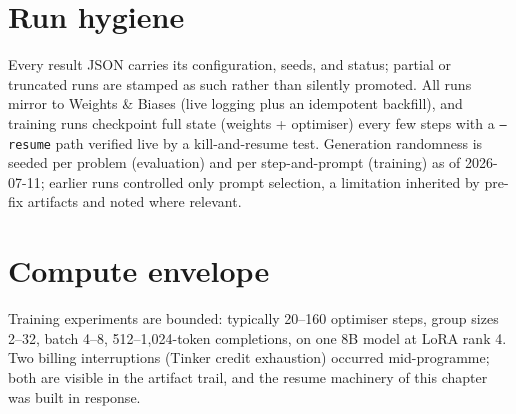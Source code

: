 \section{Run hygiene}
Every result JSON carries its configuration, seeds, and status; partial or
truncated runs are stamped as such rather than silently promoted. All runs
mirror to Weights \& Biases (live logging plus an idempotent backfill), and
training runs checkpoint full state (weights + optimiser) every few steps with
a \texttt{--resume} path verified live by a kill-and-resume test. Generation
randomness is seeded per problem (evaluation) and per step-and-prompt
(training) as of 2026-07-11; earlier runs controlled only prompt selection,
a limitation inherited by pre-fix artifacts and noted where relevant.

\section{Compute envelope}
Training experiments are bounded: typically 20--160 optimiser steps, group
sizes 2--32, batch 4--8, 512--1{,}024-token completions, on one 8B model at
LoRA rank 4. Two billing interruptions (Tinker credit exhaustion) occurred
mid-programme; both are visible in the artifact trail, and the resume
machinery of this chapter was built in response.
